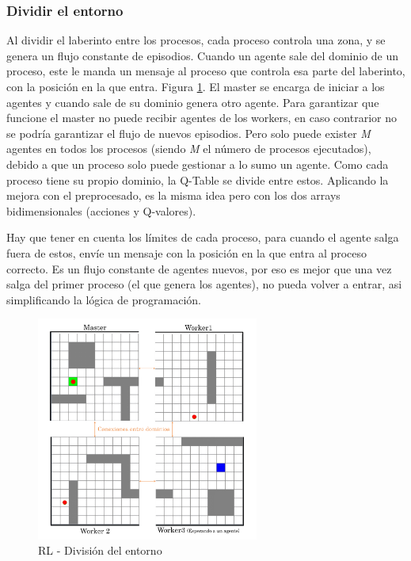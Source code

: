 		\subsubsection{Dividir el entorno}
			Al dividir el laberinto entre los procesos, cada proceso controla una zona, y se genera un flujo constante de episodios. Cuando un agente sale del dominio de un proceso, este le manda un mensaje al proceso que controla esa parte del laberinto, con la posición en la que entra. Figura \ref{fig:rlmpi}. El master se encarga de iniciar a los agentes y cuando sale de su dominio genera otro agente. Para garantizar que funcione el master no puede recibir agentes de los workers, en caso contrarior no se podría garantizar el flujo de nuevos episodios. Pero solo puede exister \textit{M} agentes en todos los procesos (siendo \textit{M} el número de procesos ejecutados), debido a que un proceso solo puede gestionar a lo sumo un agente. Como cada proceso tiene su propio dominio, la Q-Table se divide entre estos. Aplicando la mejora con el preprocesado, es la misma idea pero con los dos arrays bidimensionales (acciones y Q-valores). 
			
			Hay que tener en cuenta los límites de cada proceso, para cuando el agente salga fuera de estos, envíe un mensaje con la posición en la que entra al proceso correcto. Es un flujo constante de agentes nuevos, por eso es mejor que una vez salga del primer proceso (el que genera los agentes), no pueda volver a entrar, asi simplificando la lógica de programación.
			
			\begin{figure}[!h]
				\centering
				\includegraphics[width=0.65\textwidth]{images/chapter_3/rl_mpi}	
				\caption{RL - División del entorno}
				\label{fig:rlmpi}
			\end{figure}
	
